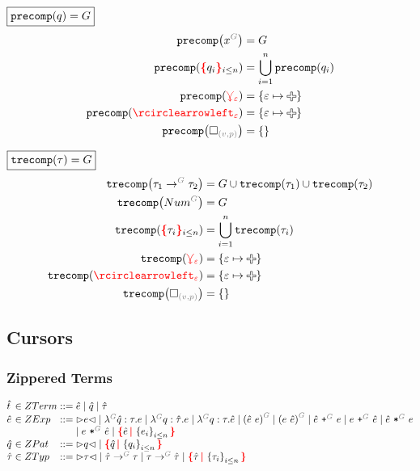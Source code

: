\noindent $\boxed{\operatorname{\texttt{precomp}}\mathopen{}\left(q\right)\mathclose{} = G}$
%
\begin{align*}
  \precomp{\pVar{G}{x}} &= G
  \\
  \precomp{\conflictHole[i \leq n]{q_i}} &= \bigcup_{i=1}^n \precomp{q_i}
  \\
  \precomp{\multiVertex{\e}} &= \SetOf{\e \mapsto \Plus}
  \\
  \precomp{\cycleVertex{\e}} &= \SetOf{\e \mapsto \Plus}
  \\
  \precomp{\emptyHole{v}{p}} &= \SetOf{}
\end{align*}

\noindent $\boxed{\operatorname{\texttt{trecomp}}\mathopen{}\left(\tau\right)\mathclose{} = G}$
%
\begin{align*}
  \trecomp{\tArrow{G}{\tau_1}{\tau_2}}
    &= G \cup \trecomp{\tau_1} \cup \trecomp{\tau_2}
  \\
  \trecomp{\tNum{G}} &= G
  \\
  \trecomp{\conflictHole[i \leq n]{\tau_i}} &= \bigcup_{i=1}^n \trecomp{\tau_i}
  \\
  \trecomp{\multiVertex{\e}} &= \SetOf{\e \mapsto \Plus}
  \\
  \trecomp{\cycleVertex{\e}} &= \SetOf{\e \mapsto \Plus}
  \\
  \trecomp{\emptyHole{v}{p}} &= \SetOf{}
\end{align*}


\subsection{Cursors}


\subsubsection{Zippered Terms}

\[
  \arraycolsep=0pt
  \begin{array}{lcllll}
    \Z{t} & {}\in{} & ZTerm & {}::={} &
      \Z{e}
      \mid \Z{q}
      \mid \Z{\tau}
    \\
    \Z{e} & {}\in{} & ZExp & {}::={} &
      \cursor{e}
      \mid \eFun{G}{\Z{q}}{\tau}{e}
      \mid \eFun{G}{q}{\Z{\tau}}{e}
      \mid \eFun{G}{q}{\tau}{\Z{e}}
      \mid \eApp{G}{\Z{e}}{e}
      \mid \eApp{G}{e}{\Z{e}}
      \mid \ePlus{G}{\Z{e}}{e}
      \mid \ePlus{G}{e}{\Z{e}}
      \mid \eTimes{G}{\Z{e}}{e}
      \\
    &&&&
      \mid \eTimes{G}{e}{\Z{e}}
      \mid \conflictHole{\Z{e}, \SetOf{e_i}_{i \leq n}}
    \\
    \Z{q} & {}\in{} & ZPat & {}::={} &
      \cursor{q}
      \mid \conflictHole{\Z{q}, \SetOf{q_i}_{i \leq n}}
    \\
    \Z{\tau} & {}\in{} & ZTyp & {}::={} &
      \cursor{\tau}
      \mid \tArrow{G}{\Z{\tau}}{\tau}
      \mid \tArrow{G}{\tau}{\Z{\tau}}
      \mid \conflictHole{\Z{\tau}, \SetOf{\tau_i}_{i \leq n}}
    \\
  \end{array}
\]

